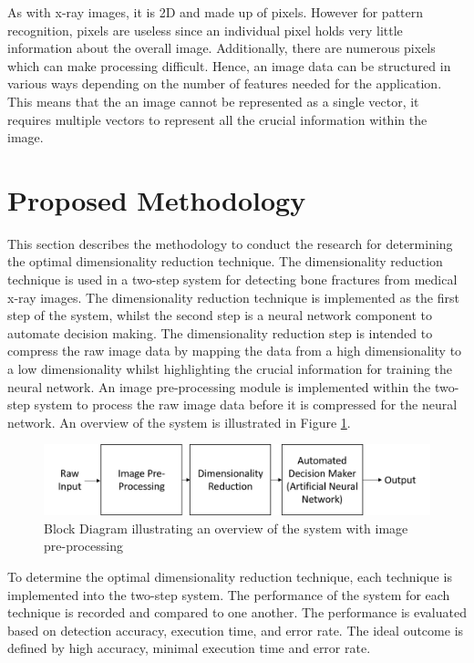 \documentclass[11pt,twocolumn]{witseiepaper}
\begin{document}
	As with x-ray images, it is 2D and made up of pixels. However for pattern recognition, pixels are useless since an individual pixel holds very little information about the overall image. Additionally, there are numerous pixels which can make processing difficult. Hence, an image data can be structured in various ways depending on the number of features needed for the application. This means that the an image cannot be represented as a single vector, it requires multiple vectors to represent all the crucial information within the image.
	
	\section{Proposed Methodology}
	\label{sc: Proposed Methodology}
	This section describes the methodology to conduct the research for determining the optimal dimensionality reduction technique. The dimensionality reduction technique is used in a two-step system for detecting bone fractures from medical x-ray images.
	The dimensionality reduction technique is implemented as the first step of the system, whilst the second step is a neural network component to automate decision making. The dimensionality reduction step is intended to compress the raw image data by mapping the data from a high dimensionality to a low dimensionality whilst highlighting the crucial information for training the neural network. An image pre-processing module is implemented within the two-step system to process the raw image data before it is compressed for the neural network. An overview of the system is illustrated in Figure \ref{fig:system overview}.
	\vspace{-3mm}
	\begin{figure}[!h]
		\centering
		\includegraphics[scale=0.23]{system_overview_2.png}
		\caption{Block Diagram illustrating an overview of the system with image pre-processing }
		\label{fig:system overview}
	\end{figure}
	
	To determine the optimal dimensionality reduction technique, each technique is implemented into the two-step system. The performance of the system for each technique is recorded and compared to one another. The performance is evaluated based on detection accuracy, execution time, and error rate. The ideal outcome is defined by high accuracy, minimal execution time and error rate.
	
\end{document}
